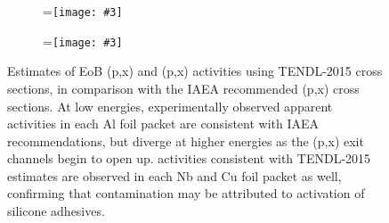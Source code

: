 \documentclass[3p]{elsarticle}
\newcommand{\subfigimg}[4][,]{%
  \setbox1=\hbox{\texttt{[image: \#3]}}%
  \leavevmode\rlap{\usebox1}%
  \rlap{\hspace*{#4pt}\raisebox{\dimexpr\ht1-2\baselineskip}{#2}}%
  \phantom{\usebox1}%
}
\begin{document}
\begin{figure}
    \centering
    \begin{subfigure}[t]{0.50\textwidth}
        \centering
        \subfigimg[width=\linewidth]{a)}{./figures/Na22_activity_compare.pdf}{50}
         \label{fig:Na22_activity_compare}
    \end{subfigure}%
     \begin{subfigure}[t]{0.50\textwidth}
        \centering
        \subfigimg[width=\linewidth]{b)}{./figures/Na24_activity_compare.pdf}{180}
         \label{fig:Na24_activity_compare}
    \end{subfigure}%
    \caption{Estimates of EoB (p,x) and (p,x) activities using TENDL-2015 cross sections, in comparison with the IAEA recommended (p,x) cross sections. At low energies, experimentally observed apparent  activities in each Al foil packet are consistent with IAEA recommendations, but diverge at higher energies as the (p,x) exit channels begin to open up.  activities consistent with TENDL-2015 estimates are observed in each Nb and Cu foil packet as well, confirming that contamination may be attributed to activation of silicone adhesives.}
     \label{fig:Na_activity_compare}
\end{figure}
\end{document}

